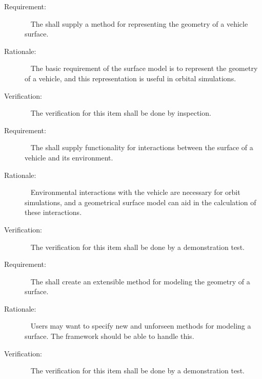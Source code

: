 \label{reqt:surfacemodel_geom_modeling}
\begin{description}
\item[Requirement:]\ \newline
The \ModelDesc shall supply a method for representing the geometry
of a vehicle surface.
\item[Rationale:]\ \newline
The basic requirement of the surface model is to represent the geometry
of a vehicle, and this representation is useful in orbital simulations.
\item[Verification:]\ \newline
The verification for this item shall be done by inspection.
\end{description}
 
 \label{reqt:surfacemodel_inter_modeling}
 \begin{description}
 \item[Requirement:]\ \newline
 The \ModelDesc shall supply functionality for interactions
 between the surface of a vehicle and its environment.
 \item[Rationale:]\ \newline
 Environmental interactions with the vehicle are necessary for orbit
 simulations, and a geometrical surface model can aid in the calculation
 of these interactions.
 \item[Verification:]\ \newline
 The verification for this item shall be done by a demonstration test.
 \end{description}
 
 \label{reqt:surfacemodel_exten_geom_modeling}
 \begin{description}
 \item[Requirement:]\ \newline
 The \ModelDesc shall create an extensible method for modeling
 the geometry of a surface.
 \item[Rationale:]\ \newline
 Users may want to specify new and unforseen methods for modeling a surface.
 The framework should be able to handle this.
 \item[Verification:]\ \newline
 The verification for this item shall be done by a demonstration test.
 \end{description}
 
